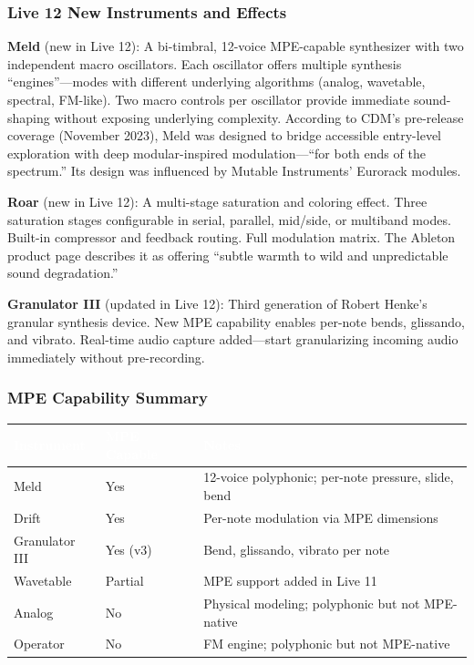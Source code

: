 \documentclass[11pt,letterpaper]{article}
\newcommand{\tableheader}[1]{\textbf{\sffamily\textcolor{white}{#1}}}
\begin{document}
\subsubsection{Live 12 New Instruments and Effects}

\textbf{Meld} (new in Live 12): A bi-timbral, 12-voice MPE-capable synthesizer with two
independent macro oscillators. Each oscillator offers multiple synthesis ``engines''---modes
with different underlying algorithms (analog, wavetable, spectral, FM-like). Two macro controls
per oscillator provide immediate sound-shaping without exposing underlying complexity. According
to CDM's pre-release coverage (November 2023), Meld was designed to bridge accessible
entry-level exploration with deep modular-inspired modulation---``for both ends of the
spectrum.'' Its design was influenced by Mutable Instruments' Eurorack modules.

\textbf{Roar} (new in Live 12): A multi-stage saturation and coloring effect. Three saturation
stages configurable in serial, parallel, mid/side, or multiband modes. Built-in compressor and
feedback routing. Full modulation matrix. The Ableton product page describes it as offering
``subtle warmth to wild and unpredictable sound degradation.''

\textbf{Granulator III} (updated in Live 12): Third generation of Robert Henke's granular
synthesis device. New MPE capability enables per-note bends, glissando, and vibrato.
Real-time audio capture added---start granularizing incoming audio immediately without
pre-recording.

\subsubsection{MPE Capability Summary}

\begin{center}
\begin{tabularx}{\textwidth}{L{3cm}C{2.5cm}X}
\toprule
{}
\tableheader{Instrument} & \tableheader{MPE Capable} & \tableheader{Notes} \\
\midrule
Meld & Yes & 12-voice polyphonic; per-note pressure, slide, bend \\
Drift & Yes & Per-note modulation via MPE dimensions \\
Granulator III & Yes (v3) & Bend, glissando, vibrato per note \\
Wavetable & Partial & MPE support added in Live 11 \\
Analog & No & Physical modeling; polyphonic but not MPE-native \\
Operator & No & FM engine; polyphonic but not MPE-native \\
\bottomrule
\end{tabularx}
\end{center}
\end{document}

